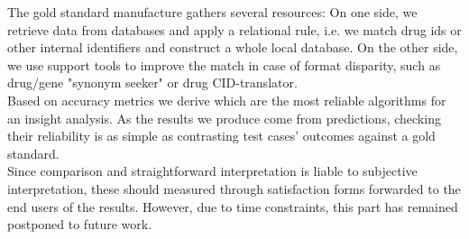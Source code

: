 The gold standard manufacture gathers several resources: On one side, we retrieve data from databases and apply a relational rule, i.e. we match drug ids or other internal identifiers and construct a whole local database. On the other side, we use support tools to improve the match in case of format disparity, such as drug/gene "synonym seeker" or drug CID-translator.
\\

Based on accuracy metrics we derive which are the most reliable algorithms for an insight analysis. As the results we produce come from predictions, checking their reliability is as simple as contrasting test cases’ outcomes against a gold standard.
\\

Since comparison and straightforward interpretation is liable to subjective interpretation, these should measured through satisfaction forms forwarded to the end users of the results. However, due to time constraints, this part has remained postponed to future work.
